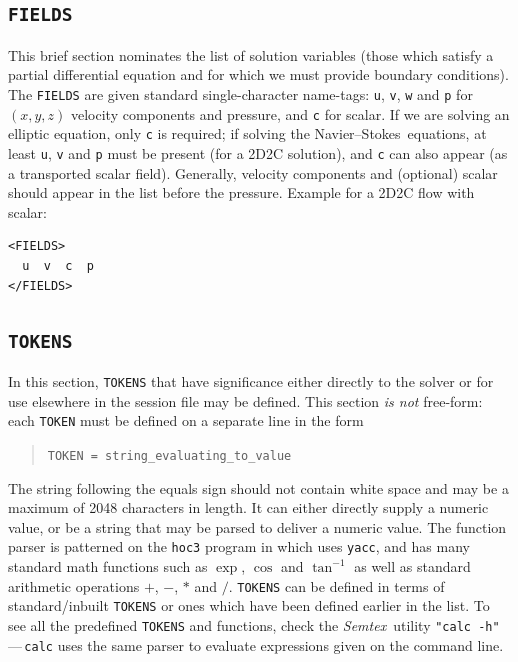 \documentclass[11pt]{report}
\newcommand{\Semtex}{\emph{Semtex}} \newcommand{\Dog}{\emph{Dog}}
\newcommand\NavSto{Navier--Stokes}
\begin{document}
\subsection{\texttt{FIELDS}}
\label{sec.fields}


This brief section nominates the list of solution variables (\ie those
which satisfy a partial differential equation and for which we must
provide boundary conditions).  The \verb|FIELDS| are given standard
single-character name-tags: \verb|u|, \verb|v|, \verb|w| and \verb|p|
for $(x,y,z)$ velocity components and pressure, and \verb|c| for
scalar.  If we are solving an elliptic equation, only \verb|c| is
required; if solving the \NavSto\ equations, at least \verb|u|,
\verb|v| and \verb|p| must be present (for a 2D2C solution), and
\verb|c| can also appear (as a transported scalar field).  Generally,
velocity components and (optional) scalar should appear in the list
before the pressure. Example for a 2D2C flow with scalar:
%
{\small
\begin{verbatim}
<FIELDS>
  u  v  c  p
</FIELDS>
\end{verbatim}
}

\subsection{\texttt{TOKENS}}
\label{sec.tokens}

In this section, \verb|TOKENS| that have significance either directly
to the solver or for use elsewhere in the session file may be defined.
This section \emph{is not} free-form: each \verb|TOKEN| must be
defined on a separate line in the form
\begin{quote}
  \verb|TOKEN = string_evaluating_to_value|
\end{quote}
The string following the equals sign should not contain white space
and may be a maximum of 2048 characters in length.  It can either
directly supply a numeric value, or be a string that may be parsed to
deliver a numeric value.  The function parser is patterned on the
\verb|hoc3| program in \citet{kernighan84} which uses \verb|yacc|, and
has many standard math functions such as $\exp$, $\cos$ and
$\tan^{-1}$ as well as standard arithmetic operations $+$, $-$, $\ast$
and $/$.  \verb|TOKENS| can be defined in terms of standard/inbuilt
\verb|TOKENS| or ones which have been defined earlier in the list.  To
see all the predefined \verb|TOKENS| and functions, check the
\Semtex\ utility \verb|"calc -h"|\,---\,\verb|calc| uses the same
parser to evaluate expressions given on the command line.
\end{document}
